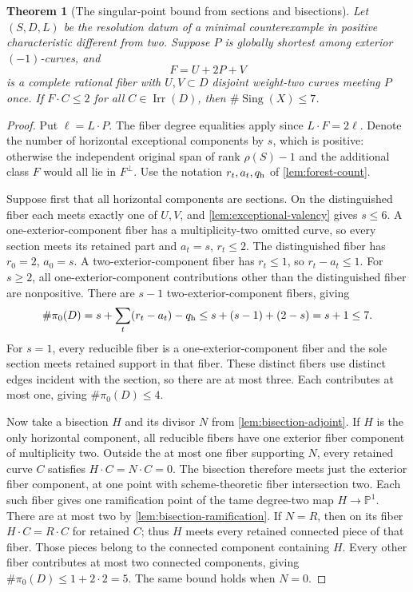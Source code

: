 \documentclass[11pt,reqno]{amsart}
\newtheorem{theorem}{Theorem}[section]
\theoremstyle{definition}
\theoremstyle{remark}
\DeclareMathOperator{\Sing}{Sing}
\DeclareMathOperator{\Irr}{Irr}
\newcommand{\PP}{\mathbb P}
\numberwithin{equation}{section}
\begin{document}
\begin{theorem}[The singular-point bound from sections and bisections]
\label{thm:two-contact-ruling}
Let $(S,D,L)$ be the resolution datum of a minimal counterexample in positive characteristic different from two. Suppose $P$ is globally
shortest among exterior $(-1)$-curves, and
\[
 F=U+2P+V
\]
is a complete rational fiber with $U,V\subset D$ disjoint
weight-two curves meeting $P$ once. If $F\cdot C\le2$ for all
$C\in\Irr(D)$, then $\#\Sing(X)\le7$.

\end{theorem}

\begin{proof}
Put $\ell=L\cdot P$. The fiber degree equalities apply since
$L\cdot F=2\ell$. Denote the number of horizontal exceptional components by
$s$, which is positive: otherwise the independent original span of rank
$\rho(S)-1$ and the additional class $F$ would all lie in $F^\perp$.
Use the notation $r_t,a_t,q_{\rm h}$ of
\cref{lem:forest-count}.

Suppose first that all horizontal components are sections.
On the distinguished fiber each meets exactly one of $U,V$, and \cref{lem:exceptional-valency} gives $s\le6$. A one-exterior-component fiber has a multiplicity-two omitted
curve, so every section meets its retained part and $a_t=s$,
$r_t\le2$. The distinguished fiber has $r_0=2$, $a_0=s$.
A two-exterior-component fiber has $r_t\le1$, so $r_t-a_t\le1$.
For $s\ge2$, all one-exterior-component contributions other than the distinguished fiber are
nonpositive. There are $s-1$ two-exterior-component fibers, giving
\[
 \#\pi_0(D)=s+\sum_t(r_t-a_t)-q_{\rm h}
 \le s+(s-1)+(2-s)=s+1\le7.
\]
For $s=1$, every reducible fiber is a one-exterior-component fiber and the sole
section meets retained support in that fiber. These distinct fibers
use distinct edges incident with the section, so there are at most
three. Each contributes at most one, giving $\#\pi_0(D)\le4$.

Now take a bisection $H$ and its divisor $N$ from
\cref{lem:bisection-adjoint}.
If $H$ is the only horizontal component, all reducible fibers have
one exterior fiber component of multiplicity two. Outside the at most one fiber
supporting $N$, every retained curve $C$ satisfies
$H\cdot C=N\cdot C=0$.
The bisection therefore meets just the exterior fiber component, at one point
with scheme-theoretic fiber intersection two. Each such fiber gives
one ramification point of the tame degree-two map $H\to\PP^1$.
There are at most two by \cref{lem:bisection-ramification}.
If $N=R$, then on its fiber $H\cdot C=R\cdot C$ for retained $C$;
thus $H$ meets every retained connected piece of that fiber.
Those pieces belong to the connected component containing $H$.
Every other fiber contributes at most two connected components, giving
$\#\pi_0(D)\le1+2\cdot2=5$. The same bound holds when $N=0$.


\end{proof}
\end{document}
